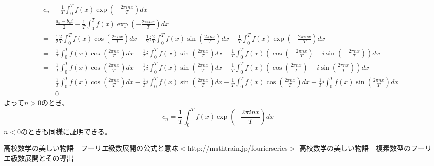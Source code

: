\documentclass[a4paper]{jsarticle}
\begin{document}
\begin{eqnarray}
	& c_n & - \frac { 1 } { T } \int _0 ^T f \left( x \right) \exp \left( - \frac { 2 \pi inx } { T } \right) dx \nonumber \\
	&=& \frac { a_n - b_n i } { 2 } - \frac { 1 } { T } \int _0 ^T f \left( x \right) \exp \left( - \frac { 2 \pi inx } { T } \right) dx \nonumber \\
	&=& \frac { 1 } { 2 } \frac { 2 } { T } \int _0 ^T f \left( x \right) \cos \left( \frac { 2 \pi nx } { T } \right) dx - \frac { 1 } { 2 } i \frac { 2 } { T } \int _0 ^T f \left( x \right) \sin \left( \frac { 2 \pi nx } { T } \right) dx - \frac { 1 } { T } \int _0 ^T f \left( x \right) \exp \left( - \frac { 2 \pi inx } { T } \right) dx \nonumber \\
	&=& \frac { 1 } { T } \int _0 ^T f \left( x \right) \cos \left( \frac { 2 \pi nx } { T } \right) dx - \frac { 1 } { T } i \int _0 ^T f \left( x \right) \sin \left( \frac { 2 \pi nx } { T } \right) dx - \frac { 1 } { T } \int _0 ^T f \left( x \right) \left( \cos \left( - \frac { 2 \pi nx } { T } \right) + i \sin \left( - \frac { 2 \pi nx } { T } \right) \right) dx \nonumber \\
	&=& \frac { 1 } { T } \int _0 ^T f \left( x \right) \cos \left( \frac { 2 \pi nx } { T } \right) dx - \frac { 1 } { T } i \int _0 ^T f \left( x \right) \sin \left( \frac { 2 \pi nx } { T } \right) dx - \frac { 1 } { T } \int _0 ^T f \left( x \right) \left( \cos \left( \frac { 2 \pi nx } { T } \right) - i \sin \left( \frac { 2 \pi nx } { T } \right) \right) dx \nonumber \\
	&=& \frac { 1 } { T } \int _0 ^T f \left( x \right) \cos \left( \frac { 2 \pi nx } { T } \right) dx - \frac { 1 } { T } i \int _0 ^T f \left( x \right) \sin \left( \frac { 2 \pi nx } { T } \right) dx - \frac { 1 } { T } \int _0 ^T f \left( x \right) \cos \left( \frac { 2 \pi nx } { T } \right) dx + \frac { 1 } { T } i \int _0 ^T f \left( x \right) \sin \left( \frac { 2 \pi nx } { T } \right) dx \nonumber \\
	&=& 0
\end{eqnarray}
よって$ n > 0 $のとき、
\begin{equation}
c_n = \frac { 1 } { T } \int _0 ^T f \left( x \right) \exp \left( - \frac { 2 \pi inx } { T } \right) dx
\end{equation}
$ n < 0 $のときも同様に証明できる。
\begin{thebibliography}{9}
	高校数学の美しい物語　フーリエ級数展開の公式と意味$<$http://mathtrain.jp/fourierseries$>$
	高校数学の美しい物語　複素数型のフーリエ級数展開とその導出
\end{thebibliography}
\end{document}
